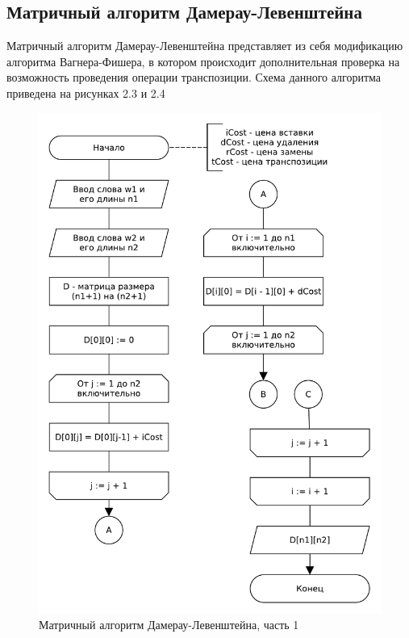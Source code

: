 \subsection{Матричный алгоритм Дамерау-Левенштейна}
Матричный алгоритм Дамерау-Левенштейна представляет из себя модификацию алгоритма Вагнера-Фишера, в котором происходит дополнительная проверка на возможность проведения операции транспозиции. Схема данного алгоритма приведена на рисунках 2.3 и 2.4
\begin{figure}[H]
    \centering
    \includegraphics[scale=0.75]{pdf/damerau-levenshteain-part1.pdf}
    \caption{Матричный алгоритм Дамерау-Левенштейна, часть 1}
\end{figure}
